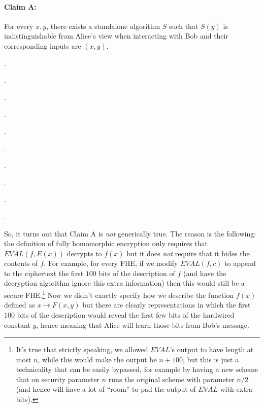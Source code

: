 \paragraph{Claim A:} For every \(x,y\), there exists a standalone
algorithm \(S\) such that \(S(y)\) is indistinguishable from Alice's
view when interacting with Bob and their corresponding inputs are
\((x,y)\).


.

.

.

.

.

.

.

.

.

.

\newpage

So, it turns out that Claim A is \emph{not} generically true. The reason
is the following: the definition of fully homomorphic encryption only
requires that \(\ensuremath{\mathit{EVAL}}(f,E(x))\) decrypts to
\(f(x)\) but it does \emph{not} require that it hides the contents of
\(f\). For example, for every FHE, if we modify
\(\ensuremath{\mathit{EVAL}}(f,c)\) to append to the ciphertext the
first \(100\) bits of the description of \(f\) (and have the decryption
algorithm ignore this extra information) then this would still be a
secure FHE.\footnote{It's true that strictly speaking, we allowed
  \(\ensuremath{\mathit{EVAL}}\)'s output to have length at most \(n\),
  while this would make the output be \(n+100\), but this is just a
  technicality that can be easily bypassed, for example by having a new
  scheme that on security parameter \(n\) runs the original scheme with
  parameter \(n/2\) (and hence will have a lot of ``room'' to pad the
  output of \(\ensuremath{\mathit{EVAL}}\) with extra bits).} Now we
didn't exactly specify how we describe the function \(f(x)\) defined as
\(x \mapsto F(x,y)\) but there are clearly representations in which the
first \(100\) bits of the description would reveal the first few bits of
the hardwired constant \(y\), hence meaning that Alice will learn those
bits from Bob's message.

